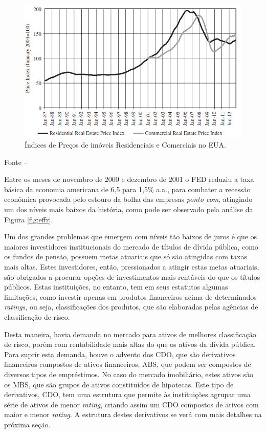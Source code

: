 \documentclass[
	12pt,				%
	oneside,			%
	a4paper,			%
	chapter=TITLE,		%
	section=TITLE,		%
	english,			%
	brazil				%
	]{abntex2}
\newcommand{\bcenter}{\begin{center}}
\newcommand{\ecenter}{\end{center}}
\begin{document}
\begin{refsection}
\begin{figure}[H]
{\centering \includegraphics[width=0.7\linewidth]{images/HPI_RCA_CPPI} 

}

\caption{Índices de Preços de imóveis Residenciais e Comerciais no EUA.}\label{fig:unnamed-chunk-21}
\end{figure}
\bcenter

Fonte -- \textcite[p.~85]{levitin2013}
\ecenter

Entre os meses de novembro de 2000 e dezembro de 2001 o \gls{FED} reduziu a taxa
básica da economia americana de 6,5 para 1,5\% a.a., para combater a recessão
econômica provocada pelo estouro da bolha das empresas \emph{ponto com}, atingindo um
dos níveis mais baixos da história, como pode ser observado pela análise da
Figura \ref{fig:effr}.

Um dos grandes problemas que emergem com níveis tão baixos de juros é que os
maiores investidores institucionais do mercado de títulos de dívida pública,
como os fundos de pensão, possuem metas atuariais que só são atingidas com taxas
mais altas. Estes investidores, então, pressionados a atingir estas metas
atuariais, são obrigados a procurar opções de investimentos mais rentáveis do
que os títulos públicos. Estas instituições, no entanto, tem em seus estatutos
algumas limitações, como investir apenas em produtos financeiros acima de
determinados \emph{ratings}, ou seja, classificações dos produtos, que são elaboradas
pelas agências de classificação de risco.

Desta maneira, havia demanda no mercado para ativos de melhores classificação de
risco, porém com rentabilidade mais altas do que os ativos da dívida pública.
Para suprir esta demanda, houve o advento dos \gls{CDO}, que são derivativos
financeiros compostos de ativos financeiros, \gls{ABS}, que podem ser compostos
de diversos tipos de empréstimos. No caso do mercado imobiliário, estes ativos
são os \gls{MBS}, que são grupos de ativos constituídos de hipotecas. Este tipo
de derivativos, \gls{CDO}, tem uma estrutura que permite às instituições agrupar
uma série de ativos de menor \emph{rating}, criando assim um \gls{CDO} compostos de
ativos com maior e menor \emph{rating}. A estrutura destes derivativos se verá com
mais detalhes na próxima seção.


\end{refsection}
\end{document}
